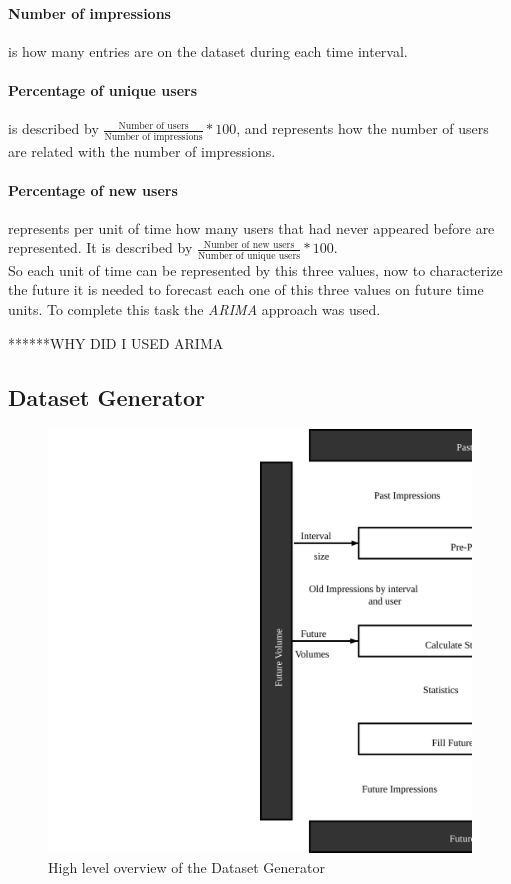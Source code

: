 \paragraph{Number of impressions}
is how many entries are on the dataset during each time interval.

\paragraph{Percentage of unique users}
is described by $\frac{\text{Number of users}}{\text{Number of impressions}}
* 100$, and represents how the number of users are related with the number of
impressions.

\paragraph{Percentage of new users}
represents per unit of time how many users that had never appeared before are
represented. It is described by $\frac{\text{Number of new users}}{\text{Number
of unique users}}*100$.
\\

So each unit of time can be represented by this three values, now to
characterize the future it is needed to forecast each one of this three values
on future time units. To complete this task the \emph{ARIMA} approach was used.


******WHY DID I USED ARIMA

\subsection{Dataset Generator}

\begin{figure}[h] \begin{center} \leavevmode
\includegraphics[]{high_level_file_gen} \caption{ High level overview
of the Dataset Generator } \label{fig:highlevel_arch_file_gen} \end{center} \end{figure}

